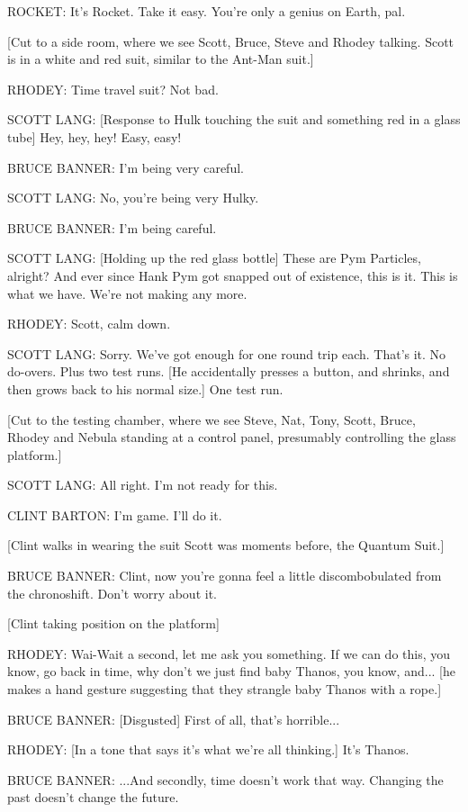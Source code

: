 ROCKET: It's Rocket. Take it easy. You're only a genius on Earth, pal.

[Cut to a side room, where we see Scott, Bruce, Steve and Rhodey talking. Scott is in a white and red suit, similar to the Ant-Man suit.]

RHODEY: Time travel suit? Not bad.

SCOTT LANG: [Response to Hulk touching the suit and something red in a glass tube] Hey, hey, hey! Easy, easy!

BRUCE BANNER: I'm being very careful.

SCOTT LANG: No, you're being very Hulky.

BRUCE BANNER: I'm being careful.

SCOTT LANG: [Holding up the red glass bottle] These are Pym Particles, alright? And ever since Hank Pym got snapped out of existence, this is it. This is what we have. We're not making any more.

RHODEY: Scott, calm down.

SCOTT LANG: Sorry. We've got enough for one round trip each. That's it. No do-overs. Plus two test runs. [He accidentally presses a button, and shrinks, and then grows back to his normal size.] One test run.

[Cut to the testing chamber, where we see Steve, Nat, Tony, Scott, Bruce, Rhodey and Nebula standing at a control panel, presumably controlling the glass platform.]

SCOTT LANG: All right. I'm not ready for this.

CLINT BARTON: I'm game. I'll do it.

[Clint walks in wearing the suit Scott was moments before, the Quantum Suit.]

BRUCE BANNER: Clint, now you're gonna feel a little discombobulated from the chronoshift. Don't worry about it.

[Clint taking position on the platform]

RHODEY: Wai-Wait a second, let me ask you something. If we can do this, you know, go back in time, why don't we just find baby Thanos, you know, and... [he makes a hand gesture suggesting that they strangle baby Thanos with a rope.]

BRUCE BANNER: [Disgusted] First of all, that's horrible...

RHODEY: [In a tone that says it's what we're all thinking.] It's Thanos.

BRUCE BANNER: ...And secondly, time doesn't work that way. Changing the past doesn't change the future.

